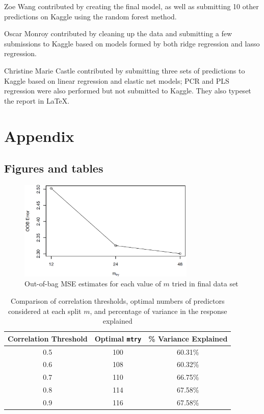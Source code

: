 \documentclass{scrartcl}
\begin{document}
Zoe Wang contributed by creating the final model, as well as submitting 10 other predictions on Kaggle using the random forest method.

Oscar Monroy contributed by cleaning up the data and submitting a few submissions to Kaggle based on models formed by both ridge regression and lasso regression.

Christine Marie Castle contributed by submitting three sets of predictions to Kaggle based on linear regression and elastic net models; PCR and PLS regression were also performed but not submitted to Kaggle. They also typeset the report in \LaTeX.

\pagebreak

\section*{Appendix}

\subsection*{Figures and tables}

\begin{figure}[h]
    \centering
    \includegraphics[width=0.75\textwidth]{oob_vs_mtry.png}
    \caption{Out-of-bag MSE estimates for each value of \(m\) tried in final data set}
    \label{fig:oob}
\end{figure}

\begin{table}[h]
    \centering
    \begin{tabular}{| c | c | c |}
         \hline
         Correlation Threshold & Optimal \verb|mtry| & \% Variance Explained\\
         \hline
         0.5 & 100 & 60.31\%\\
         \hline
         0.6 & 108 & 60.32\%\\
         \hline
         0.7 & 110 & 66.75\%\\
         \hline
         0.8 & 114 & 67.58\%\\
         \hline
         0.9 & 116 & 67.58\%\\
         \hline
    \end{tabular}
    \caption{Comparison of correlation thresholds, optimal numbers of predictors considered at each split \(m\), and percentage of variance in the response explained}
    \label{table:thresholds}
\end{table}
\end{document}
